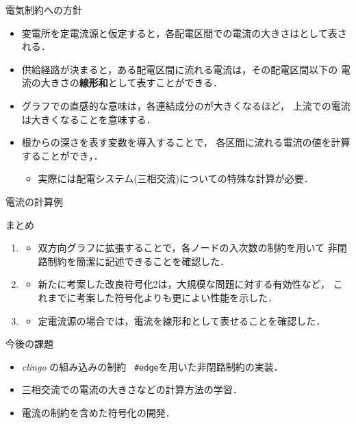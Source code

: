 \documentclass[dvipdfmx,11pt]{beamer}
\begin{document}
\begin{frame}{電気制約への方針}
 \begin{itemize}
  \item 変電所を定電流源と仮定すると，各配電区間での電流の大きさはとして表される．
  \item 供給経路が決まると，ある配電区間に流れる電流は，その配電区間以下の
		電流の大きさの\alert{\bf 線形和}として表すことができる．
  \item グラフでの直感的な意味は，各連結成分のが大きくなるほど，
		上流での電流は大きくなることを意味する．
  \item 根からの深さを表す変数を導入することで，
		各区間に流れる電流の値を計算することができ，．
		\begin{itemize}
		 \item 実際には配電システム(三相交流)についての特殊な計算が必要．
		\end{itemize}
 \end{itemize}\vfill
 \begin{exampleblock}{電流の計算例}
  \centering
  
 \end{exampleblock} \vfill
\end{frame}
\begin{frame}{まとめ}
 \begin{enumerate}
  \item {}
		\begin{itemize}
		 \item 双方向グラフに拡張することで，各ノードの入次数の制約を用いて
			   非閉路制約を簡潔に記述できることを確認した．
		\end{itemize}
  \item {}
		\begin{itemize}
		 \item 新たに考案した改良符号化2は，大規模な問題に対する有効性など，
			   これまでに考案した符号化よりも更によい性能を示した．
		\end{itemize}
  \item {}
		\begin{itemize}
		 \item 定電流源の場合では，電流を線形和として表せることを確認した．
		\end{itemize}
 \end{enumerate} \vfill
 \begin{alertblock}{今後の課題}
  \begin{itemize}
   \item \textit{clingo} の組み込みの制約 ~\texttt{\#edge}を用いた非閉路制約の実装．
   \item 三相交流での電流の大きさなどの計算方法の学習．
   \item 電流の制約を含めた符号化の開発．
  \end{itemize}
 \end{alertblock} \vfill
\end{frame}



\end{document}
